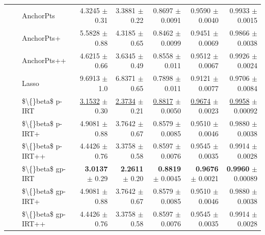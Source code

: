 \begin{longtable}{llp{}rrrrr}
 &  & AnchorPts & 4.3245 {\scriptsize $\pm$ 0.31} & 3.3881 {\scriptsize $\pm$ 0.22} & 0.8697 {\scriptsize $\pm$ 0.0091} & 0.9590 {\scriptsize $\pm$ 0.0040} & 0.9933 {\scriptsize $\pm$ 0.0015} \\
 &  & AnchorPts+ & 5.5828 {\scriptsize $\pm$ 0.88} & 4.3185 {\scriptsize $\pm$ 0.65} & 0.8462 {\scriptsize $\pm$ 0.0099} & 0.9451 {\scriptsize $\pm$ 0.0069} & 0.9866 {\scriptsize $\pm$ 0.0038} \\
 &  & AnchorPts++ & 4.6215 {\scriptsize $\pm$ 0.66} & 3.6345 {\scriptsize $\pm$ 0.49} & 0.8558 {\scriptsize $\pm$ 0.011} & 0.9512 {\scriptsize $\pm$ 0.0067} & 0.9926 {\scriptsize $\pm$ 0.0024} \\
 &  & Lasso & 9.6913 {\scriptsize $\pm$ 1.0} & 6.8371 {\scriptsize $\pm$ 0.65} & 0.7898 {\scriptsize $\pm$ 0.011} & 0.9121 {\scriptsize $\pm$ 0.0077} & 0.9706 {\scriptsize $\pm$ 0.0084} \\
 &  & \$\textbackslash\{\}beta\$ p-IRT & \underline{3.1532} {\scriptsize $\pm$ 0.30} & \underline{2.3734} {\scriptsize $\pm$ 0.21} & \underline{0.8817} {\scriptsize $\pm$ 0.0050} & \underline{0.9674} {\scriptsize $\pm$ 0.0023} & \underline{0.9958} {\scriptsize $\pm$ 0.00092} \\
 &  & \$\textbackslash\{\}beta\$ p-IRT+ & 4.9081 {\scriptsize $\pm$ 0.88} & 3.7642 {\scriptsize $\pm$ 0.67} & 0.8579 {\scriptsize $\pm$ 0.0085} & 0.9510 {\scriptsize $\pm$ 0.0046} & 0.9880 {\scriptsize $\pm$ 0.0038} \\
 &  & \$\textbackslash\{\}beta\$ p-IRT++ & 4.4426 {\scriptsize $\pm$ 0.76} & 3.3758 {\scriptsize $\pm$ 0.58} & 0.8597 {\scriptsize $\pm$ 0.0076} & 0.9545 {\scriptsize $\pm$ 0.0035} & 0.9914 {\scriptsize $\pm$ 0.0028} \\
 &  & \$\textbackslash\{\}beta\$ gp-IRT & \textbf{3.0137} {\scriptsize $\pm$ 0.29} & \textbf{2.2611} {\scriptsize $\pm$ 0.20} & \textbf{0.8819} {\scriptsize $\pm$ 0.0045} & \textbf{0.9676} {\scriptsize $\pm$ 0.0021} & \textbf{0.9960} {\scriptsize $\pm$ 0.00089} \\
 &  & \$\textbackslash\{\}beta\$ gp-IRT+ & 4.9081 {\scriptsize $\pm$ 0.88} & 3.7642 {\scriptsize $\pm$ 0.67} & 0.8579 {\scriptsize $\pm$ 0.0085} & 0.9510 {\scriptsize $\pm$ 0.0046} & 0.9880 {\scriptsize $\pm$ 0.0038} \\
 &  & \$\textbackslash\{\}beta\$ gp-IRT++ & 4.4426 {\scriptsize $\pm$ 0.76} & 3.3758 {\scriptsize $\pm$ 0.58} & 0.8597 {\scriptsize $\pm$ 0.0076} & 0.9545 {\scriptsize $\pm$ 0.0035} & 0.9914 {\scriptsize $\pm$ 0.0028} \\

\end{longtable}

